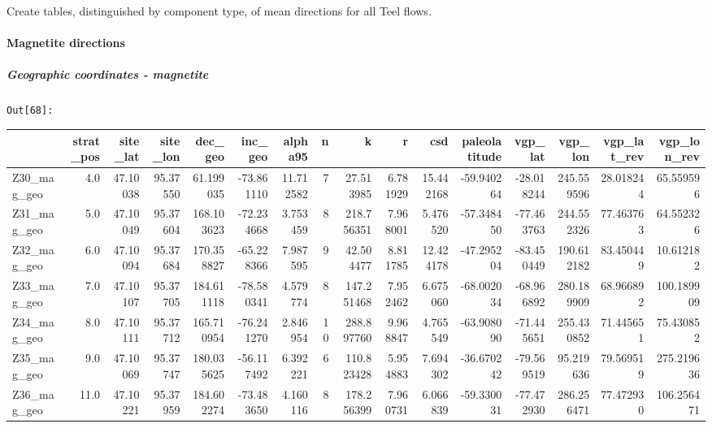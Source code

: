 \documentclass[11pt]{article}
\begin{document}
    Create tables, distinguished by component type, of mean directions for
all Teel flows.

    \paragraph{Magnetite directions}\label{magnetite-directions}

    \subparagraph{Geographic coordinates -
magnetite}\label{geographic-coordinates---magnetite}

\texttt{\color{outcolor}Out[{\color{outcolor}68}]:}
    
    \begin{sidewaystable}
    {\tiny\begin{tabular}{lrrrrrrrrrrrrrrr}
\toprule
{} &  strat\_pos &  site\_lat &  site\_lon &     dec\_geo &    inc\_geo &    alpha95 &   n &           k &         r &        csd &  paleolatitude &    vgp\_lat &     vgp\_lon &  vgp\_lat\_rev &  vgp\_lon\_rev \\
\midrule
Z30\_mag\_geo &        4.0 &  47.10038 &  95.37550 &   61.199035 & -73.861110 &  11.712582 &   7 &   27.513985 &  6.781929 &  15.442168 &     -59.940264 & -28.018244 &  245.559596 &    28.018244 &    65.559596 \\
Z31\_mag\_geo &        5.0 &  47.10049 &  95.37604 &  168.103623 & -72.234668 &   3.753459 &   8 &  218.756351 &  7.968001 &   5.476520 &     -57.348450 & -77.463763 &  244.552326 &    77.463763 &    64.552326 \\
Z32\_mag\_geo &        6.0 &  47.10094 &  95.37684 &  170.358827 & -65.228366 &   7.987595 &   9 &   42.504477 &  8.811785 &  12.424178 &     -47.295204 & -83.450449 &  190.612182 &    83.450449 &    10.612182 \\
Z33\_mag\_geo &        7.0 &  47.10107 &  95.37705 &  184.611118 & -78.580341 &   4.579774 &   8 &  147.251468 &  7.952462 &   6.675060 &     -68.002034 & -68.966892 &  280.189909 &    68.966892 &   100.189909 \\
Z34\_mag\_geo &        8.0 &  47.10111 &  95.37712 &  165.710954 & -76.241270 &   2.846954 &  10 &  288.897760 &  9.968847 &   4.765549 &     -63.908090 & -71.445651 &  255.430852 &    71.445651 &    75.430852 \\
Z35\_mag\_geo &        9.0 &  47.10069 &  95.37747 &  180.035625 & -56.117492 &   6.392221 &   6 &  110.823428 &  5.954883 &   7.694302 &     -36.670242 & -79.569519 &   95.219636 &    79.569519 &   275.219636 \\
Z36\_mag\_geo &       11.0 &  47.10221 &  95.37959 &  184.602274 & -73.483650 &   4.160116 &   8 &  178.256399 &  7.960731 &   6.066839 &     -59.330031 & -77.472930 &  286.256471 &    77.472930 &   106.256471 \\

\end{tabular}}
\end{sidewaystable}
\end{document}
